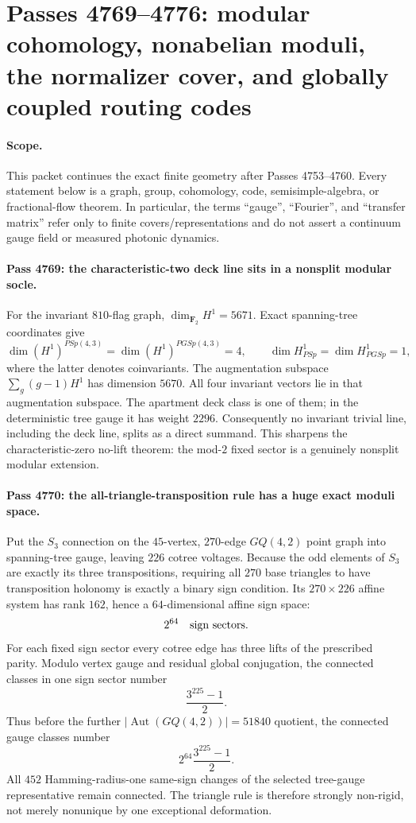 \section*{Passes 4769--4776: modular cohomology, nonabelian moduli, the normalizer cover, and globally coupled routing codes}
\paragraph{Scope.}
This packet continues the exact finite geometry after Passes 4753--4760.  Every statement below is a graph, group, cohomology, code, semisimple-algebra, or fractional-flow theorem.  In particular, the terms ``gauge'', ``Fourier'', and ``transfer matrix'' refer only to finite covers/representations and do not assert a continuum gauge field or measured photonic dynamics.

\paragraph{Pass 4769: the characteristic-two deck line sits in a nonsplit modular socle.}
For the invariant $810$-flag graph, $\dim_{\mathbf F_2}H^1=5671$.  Exact spanning-tree coordinates give
\[
 \dim (H^1)^{PSp(4,3)}=\dim (H^1)^{PGSp(4,3)}=4,
 \qquad
 \dim H^1_{PSp}=\dim H^1_{PGSp}=1,
\]
where the latter denotes coinvariants.  The augmentation subspace
$\sum_g(g-1)H^1$ has dimension $5670$.  All four invariant vectors lie in that augmentation subspace.  The apartment deck class is one of them; in the deterministic tree gauge it has weight $2296$.  Consequently no invariant trivial line, including the deck line, splits as a direct summand.  This sharpens the characteristic-zero no-lift theorem: the mod-$2$ fixed sector is a genuinely nonsplit modular extension.

\paragraph{Pass 4770: the all-triangle-transposition rule has a huge exact moduli space.}
Put the $S_3$ connection on the $45$-vertex, $270$-edge $GQ(4,2)$ point graph into spanning-tree gauge, leaving $226$ cotree voltages.  Because the odd elements of $S_3$ are exactly its three transpositions, requiring all $270$ base triangles to have transposition holonomy is exactly a binary sign condition.  Its $270\times226$ affine system has rank $162$, hence a $64$-dimensional affine sign space:
\[
 2^{64}\quad\hbox{sign sectors}.
\]
For each fixed sign sector every cotree edge has three lifts of the prescribed parity.  Modulo vertex gauge and residual global conjugation, the connected classes in one sign sector number
\[
 \frac{3^{225}-1}{2}.
\]
Thus before the further $|\operatorname{Aut}(GQ(4,2))|=51840$ quotient, the connected gauge classes number
\[
 2^{64}\frac{3^{225}-1}{2}.
\]
All $452$ Hamming-radius-one same-sign changes of the selected tree-gauge representative remain connected.  The triangle rule is therefore strongly non-rigid, not merely nonunique by one exceptional deformation.

